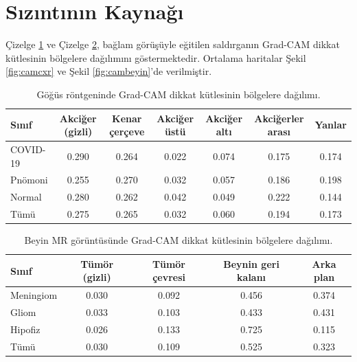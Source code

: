 \section{Sızıntının Kaynağı}\label{sec:res:root}

Çizelge \ref{tbl:gradcamcxr} ve Çizelge \ref{tbl:gradcambeyin}, bağlam görüşüyle eğitilen saldırganın Grad-CAM dikkat kütlesinin bölgelere dağılımını göstermektedir. Ortalama haritalar Şekil \ref{fig:camcxr} ve Şekil \ref{fig:cambeyin}'de verilmiştir.

\begin{table}[h!]
{\setlength{\tabcolsep}{4pt}
\caption{Göğüs röntgeninde Grad-CAM dikkat kütlesinin bölgelere dağılımı.}
\begin{center}
\vspace{-6mm}
\begin{tabular}{lcccccc}
\hline\hline
Sınıf & Akciğer (gizli) & Kenar çerçeve & Akciğer üstü & Akciğer altı & Akciğerler arası & Yanlar \\
\hline
COVID-19 & 0.290 & 0.264 & 0.022 & 0.074 & 0.175 & 0.174 \\
Pnömoni & 0.255 & 0.270 & 0.032 & 0.057 & 0.186 & 0.198 \\
Normal & 0.280 & 0.262 & 0.042 & 0.049 & 0.222 & 0.144 \\
Tümü & 0.275 & 0.265 & 0.032 & 0.060 & 0.194 & 0.173 \\
\hline
\end{tabular}
\vspace{-6mm}
\end{center}
\label{tbl:gradcamcxr}}
\end{table}

\begin{table}[h!]
{\setlength{\tabcolsep}{10pt}
\caption{Beyin MR görüntüsünde Grad-CAM dikkat kütlesinin bölgelere dağılımı.}
\begin{center}
\vspace{-6mm}
\begin{tabular}{lcccc}
\hline\hline
Sınıf & Tümör (gizli) & Tümör çevresi & Beynin geri kalanı & Arka plan \\
\hline
Meningiom & 0.030 & 0.092 & 0.456 & 0.374 \\
Gliom & 0.033 & 0.103 & 0.433 & 0.431 \\
Hipofiz & 0.026 & 0.133 & 0.725 & 0.115 \\
Tümü & 0.030 & 0.109 & 0.525 & 0.323 \\
\hline
\end{tabular}
\vspace{-6mm}
\end{center}
\label{tbl:gradcambeyin}}
\end{table}

